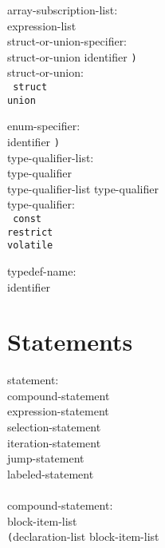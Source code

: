 \documentclass[a4j,twocolumn]{article}
\begin{document}
\noindent
array-subscription-list: \\
\quad expression-list \\

\noindent
struct-or-union-specifier: \\
\quad {\tt (}struct-or-union identifier {\tt )} \\

\noindent
struct-or-union: \\ \tt
\quad struct \\
\quad union \\ \it

\noindent
enum-specifier: \\
 identifier {\tt )} \\

\noindent
type-qualifier-list: \\
\quad type-qualifier \\
\quad type-qualifier-list type-qualifier \\

\noindent
type-qualifier: \\ \tt
\quad const \\
\quad restrict \\
\quad volatile \\ \it

\noindent
typedef-name: \\
\quad identifier \\

\rm
\section{Statements}

\it

\noindent
statement: \\
\quad compound-statement \\
\quad expression-statement \\
\quad selection-statement \\
\quad iteration-statement \\
\quad jump-statement \\
\quad labeled-statement \\
\quad {\tt ()} \\

\noindent
compound-statement: \\
 block-item-list\opt {\tt )} \\
 {\tt (}declaration-list\opt {\tt )} block-item-list\opt {\tt )} \\
\end{document}
